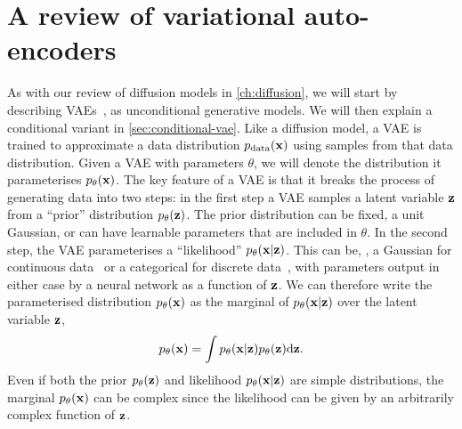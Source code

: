 \section{A review of variational auto-encoders}
\label{sec:vae}
As with our review of diffusion models in \cref{ch:diffusion}, we will start by describing VAEs~\citep{kingma2013auto,rezende2014stochastic}, as unconditional generative models. We will then explain a conditional variant in \cref{sec:conditional-vae}. Like a diffusion model, a VAE is trained to approximate a data distribution $p_{\rm{data}}({\mathbf{x}})$ using samples from that data distribution. Given a VAE with parameters $\theta$, we will denote the distribution it parameterises $p_\theta({\mathbf{x}})$. The key feature of a VAE is that it breaks the process of generating data into two steps: in the first step a VAE samples a latent variable ${\mathbf{z}}$ from a ``prior'' distribution $p_\theta({\mathbf{z}})$. The prior distribution can be fixed, \eg a unit Gaussian, or can have learnable parameters that are included in $\theta$. In the second step, the VAE parameterises a ``likelihood'' $p_\theta({\mathbf{x}}|{\mathbf{z}})$. This can be, \eg, a Gaussian for continuous data~\citep{kingma2013auto} or a categorical for discrete data~\citep{child2020very}, with parameters output in either case by a neural network as a function of ${\mathbf{z}}$. We can therefore write the parameterised distribution $p_\theta({\mathbf{x}})$ as the marginal of $p_\theta({\mathbf{x}}|{\mathbf{z}})$ over the latent variable ${\mathbf{z}}$,
\begin{equation} \label{eq:vae-marginal}
p_\theta({\mathbf{x}}) = \int p_\theta({\mathbf{x}}|{\mathbf{z}})p_\theta({\mathbf{z}}) \mathrm{d}{\mathbf{z}}.
\end{equation}
Even if both the prior $p_\theta({\mathbf{z}})$ and likelihood $p_\theta({\mathbf{x}}|{\mathbf{z}})$ are simple distributions, the marginal $p_\theta({\mathbf{x}})$ can be complex since the likelihood can be given by an arbitrarily complex function of ${\mathbf{z}}$.

